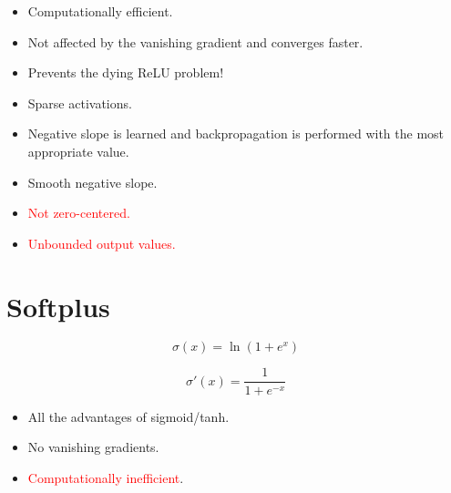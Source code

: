 \documentclass{article}
\begin{document}
\begin{itemize}
  \item Computationally efficient.
  \item Not affected by the vanishing gradient and converges faster.
  \item Prevents the dying ReLU problem!
  \item Sparse activations.
  \item Negative slope is learned and backpropagation is performed with the most appropriate value.
  \item Smooth negative slope.
  \item \textcolor{red}{Not zero-centered.}
  \item \textcolor{red}{Unbounded output values.}
\end{itemize}

\clearpage

\section{Softplus}

\begin{figure}[!htb]
  \centering
\end{figure}

\begin{equation}
  \sigma(x) = \ln(1 + e^x)
\end{equation}

\begin{equation}
  \sigma'(x) = \frac{1}{1 + e^{-x}}
\end{equation}

\begin{itemize}
  \item All the advantages of sigmoid/tanh.
  \item No vanishing gradients.
  \item \textcolor{red}{Computationally inefficient}.
\end{itemize}
\end{document}
